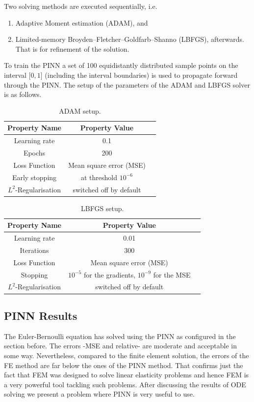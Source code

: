 \documentclass[a4paper,11pt]{article}
\begin{document}
Two solving methods are executed sequentially, i.e.
\begin{enumerate}
\item Adaptive Moment estimation (ADAM), and
\item Limited-memory Broyden–Fletcher–Goldfarb–Shanno (LBFGS), afterwards. That is for refinement of the solution.
\end{enumerate}
To train the PINN a set of 100 equidistantly distributed sample points on the interval $\lbrack 0, 1 \rbrack $ (including the interval boundaries) is used to propagate forward through the PINN. The setup of the parameters of the ADAM and LBFGS solver is as follows.

\begin{table}[htbp]
\centering
\begin{tabular}{ccl}
\toprule
\textbf{Property Name} & \textbf{Property Value}\\
\midrule
Learning rate & 0.1\\
Epochs & 200 \\
Loss Function & Mean square error (MSE) \\
Early stopping & at threshold $10^{-6} $ \\
$L^2$-Regularisation & switched off by default \\
\bottomrule
\end{tabular}
\caption{ADAM setup.}
\end{table}

\begin{table}[h!]
\centering
\begin{tabular}{ccl}
\toprule
\textbf{Property Name} & \textbf{Property Value}\\
\midrule
Learning rate & 0.01\\
Iterations & 300 \\
Loss Function & Mean square error (MSE) \\
Stopping & $10^{-5} $ for the gradients, $10^{-9} $ for the MSE\\
$L^2$-Regularisation & switched off by default \\
\bottomrule
\end{tabular}
\caption{LBFGS setup.}
\end{table}

\subsection*{PINN Results}
The Euler-Bernoulli equation has solved using the PINN as configured in the section before. The errors -MSE and relative- are moderate and acceptable in some way. Nevertheless, compared to the finite element solution, the errors of the FE method are far below the ones of the PINN method. That confirms just the fact that FEM was designed to solve linear elasticity problems and hence FEM is a very powerful tool tackling such problems. After discussing the results of ODE solving we present a problem where PINN is very useful to use.
\end{document}
